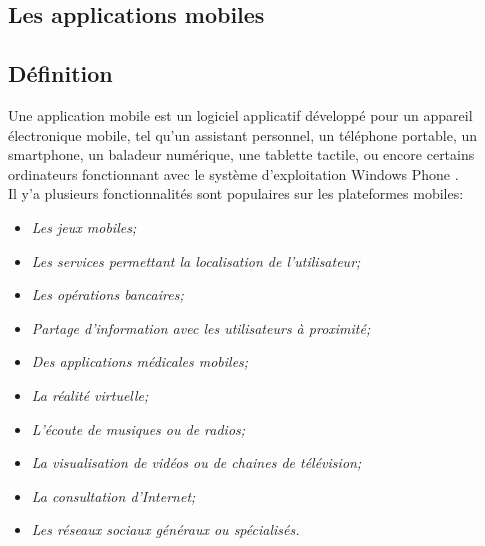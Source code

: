 \documentclass[french,a4,12pt]{report}
\begin{document}
\begin{tcolorbox}[leftrule=3mm]
\section{Les applications mobiles}
\end{tcolorbox}
\begin{tcolorbox}[colframe=green!75,rightrule=0.5cm,leftrule=0.5cm,]
	\subsection{  Définition }
\end{tcolorbox}
\quad \textsf{ Une application mobile est un logiciel applicatif développé pour un appareil électronique mobile, tel qu'un assistant personnel, un téléphone portable, un smartphone, un baladeur numérique, une tablette tactile, ou encore certains ordinateurs fonctionnant avec le système d'exploitation Windows Phone} \cite{1}.\\

\textsf{Il y'a plusieurs fonctionnalités sont populaires sur les plateformes mobiles:}
\begin{itemize}%
	\item \textit{Les jeux mobiles;}
	\item \textit{Les services permettant la localisation de l'utilisateur;}
	\item \textit{ Les opérations bancaires;}
	\item  \textit{Partage d'information avec les utilisateurs à proximité;} 
	\item \textit{ Des applications médicales mobiles;}
	\item  \textit{La réalité virtuelle;}
	\item  \textit{L'écoute de musiques ou de radios;}
	\item  \textit{La visualisation de vidéos ou de chaines de télévision;}
	\item  \textit{La consultation d'Internet;}
	\item  \textit{Les réseaux sociaux généraux ou spécialisés.}
\end{itemize}
\end{document}
